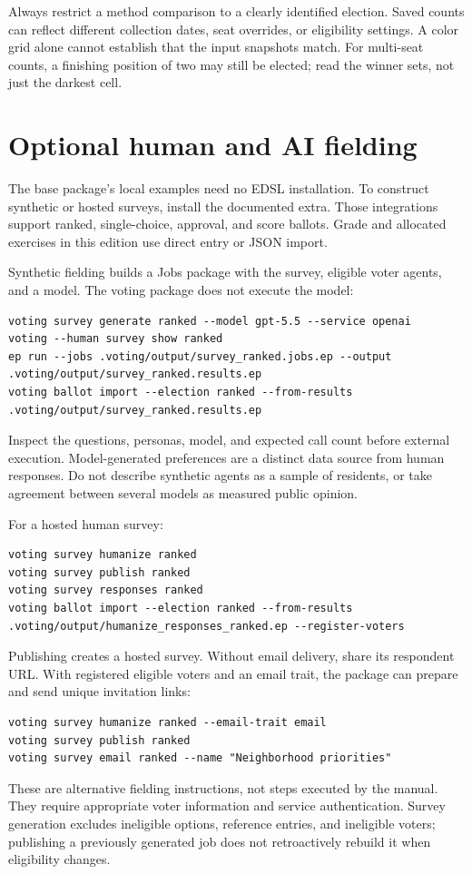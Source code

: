 Always restrict a method comparison to a clearly identified election. Saved counts can reflect different collection dates, seat overrides, or eligibility settings. A color grid alone cannot establish that the input snapshots match. For multi-seat counts, a finishing position of two may still be elected; read the winner sets, not just the darkest cell.

\section{Optional human and AI fielding}
The base package's local examples need no EDSL installation. To construct synthetic or hosted surveys, install the documented  extra. Those integrations support ranked, single-choice, approval, and score ballots. Grade and allocated exercises in this edition use direct entry or JSON import.

Synthetic fielding builds a Jobs package with the survey, eligible voter agents, and a model. The voting package does not execute the model:
\begin{lstlisting}
voting survey generate ranked --model gpt-5.5 --service openai
voting --human survey show ranked
ep run --jobs .voting/output/survey_ranked.jobs.ep --output .voting/output/survey_ranked.results.ep
voting ballot import --election ranked --from-results .voting/output/survey_ranked.results.ep
\end{lstlisting}
Inspect the questions, personas, model, and expected call count before external execution. Model-generated preferences are a distinct data source from human responses. Do not describe synthetic agents as a sample of residents, or take agreement between several models as measured public opinion.

For a hosted human survey:
\begin{lstlisting}
voting survey humanize ranked
voting survey publish ranked
voting survey responses ranked
voting ballot import --election ranked --from-results .voting/output/humanize_responses_ranked.ep --register-voters
\end{lstlisting}
Publishing creates a hosted survey. Without email delivery, share its respondent URL. With registered eligible voters and an email trait, the package can prepare and send unique invitation links:
\begin{lstlisting}
voting survey humanize ranked --email-trait email
voting survey publish ranked
voting survey email ranked --name "Neighborhood priorities"
\end{lstlisting}
These are alternative fielding instructions, not steps executed by the manual. They require appropriate voter information and service authentication. Survey generation excludes ineligible options, reference entries, and ineligible voters; publishing a previously generated job does not retroactively rebuild it when eligibility changes.

